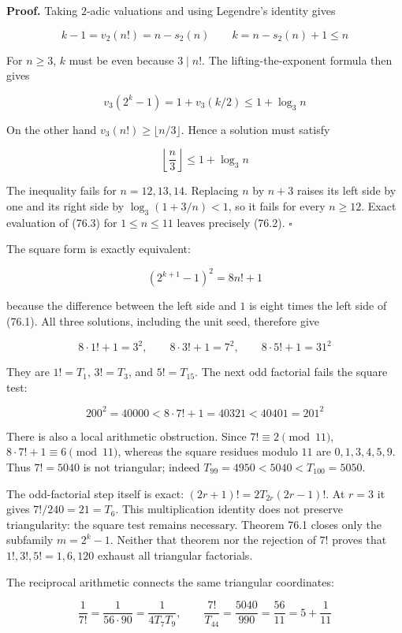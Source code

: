 \documentclass[
  11pt,
]{book}
\begin{document}
\textbf{Proof.} Taking \(2\)-adic valuations and using Legendre's
identity gives

\[
k-1=v_2(n!)=n-s_2(n)
\qquad
k=n-s_2(n)+1\le n
\tag{76.3}
\]

For \(n\ge3\), \(k\) must be even because \(3\mid n!\). The
lifting-the-exponent formula then gives

\[
v_3(2^k-1)=1+v_3(k/2)\le1+\log_3 n
\tag{76.4}
\]

On the other hand \(v_3(n!)\ge\lfloor n/3\rfloor\). Hence a solution
must satisfy

\[
\left\lfloor\frac n3\right\rfloor\le1+\log_3 n
\tag{76.5}
\]

The inequality fails for \(n=12,13,14\). Replacing \(n\) by \(n+3\)
raises its left side by one and its right side by \(\log_3(1+3/n)<1\),
so it fails for every \(n\ge12\). Exact evaluation of (76.3) for
\(1\le n\le11\) leaves precisely (76.2). \(\square\)

The square form is exactly equivalent:

\[
\boxed{(2^{k+1}-1)^2=8n!+1}
\tag{76.6}
\]

because the difference between the left side and \(1\) is eight times
the left side of (76.1). All three solutions, including the unit seed,
therefore give

\[
\boxed{8\cdot1!+1=3^2,\qquad
8\cdot3!+1=7^2,\qquad
8\cdot5!+1=31^2}
\tag{76.6a}
\]

They are \(1!=T_1\), \(3!=T_3\), and \(5!=T_{15}\). The next odd
factorial fails the square test:

\[
\boxed{200^2=40000<8\cdot7!+1=40321<40401=201^2}
\tag{76.6b}
\]

There is also a local arithmetic obstruction. Since
\(7!\equiv2\pmod{11}\), \(8\cdot7!+1\equiv6\pmod{11}\), whereas the
square residues modulo \(11\) are \(0,1,3,4,5,9\). Thus \(7!=5040\) is
not triangular; indeed \(T_{99}=4950<5040<T_{100}=5050\).

The odd-factorial step itself is exact: \((2r+1)!=2T_{2r}(2r-1)!\). At
\(r=3\) it gives \(7!/240=21=T_6\). This multiplication identity does
not preserve triangularity: the square test remains necessary. Theorem
76.1 closes only the subfamily \(m=2^k-1\). Neither that theorem nor the
rejection of \(7!\) proves that \(1!,3!,5!=1,6,120\) exhaust all
triangular factorials.

The reciprocal arithmetic connects the same triangular coordinates:

\[
\boxed{\frac1{7!}=\frac1{56\cdot90}=\frac1{4T_7T_9},\qquad
\frac{7!}{T_{44}}=\frac{5040}{990}=\frac{56}{11}=5+\frac1{11}}
\tag{76.6c}
\]
\end{document}
